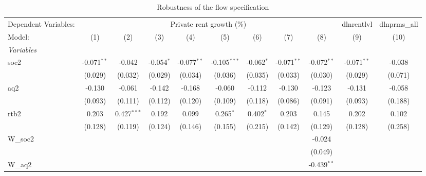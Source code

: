 
\begin{table}[htbp]
   \caption{Robustness of the flow specification}
   \centering
   \begin{tabular}{lcccccccccc}
      \tabularnewline \midrule \midrule
      Dependent Variables: & \multicolumn{8}{c}{Private rent growth (\%)} & dlnrentlvl & dlnprms\_all\\
      Model:        & (1)           & (2)           & (3)          & (4)           & (5)            & (6)          & (7)           & (8)           & (9)           & (10)\\  
      \midrule
      \emph{Variables}\\
      soc2          & -0.071$^{**}$ & -0.042        & -0.054$^{*}$ & -0.077$^{**}$ & -0.105$^{***}$ & -0.062$^{*}$ & -0.071$^{**}$ & -0.072$^{**}$ & -0.071$^{**}$ & -0.038\\   
                    & (0.029)       & (0.032)       & (0.029)      & (0.034)       & (0.036)        & (0.035)      & (0.033)       & (0.030)       & (0.029)       & (0.071)\\   
      aq2           & -0.130        & -0.061        & -0.142       & -0.168        & -0.060         & -0.112       & -0.130        & -0.123        & -0.131        & -0.058\\   
                    & (0.093)       & (0.111)       & (0.112)      & (0.120)       & (0.109)        & (0.118)      & (0.086)       & (0.091)       & (0.093)       & (0.188)\\   
      rtb2          & 0.203         & 0.427$^{***}$ & 0.192        & 0.099         & 0.265$^{*}$    & 0.402$^{*}$  & 0.203         & 0.145         & 0.202         & 0.102\\   
                    & (0.128)       & (0.119)       & (0.124)      & (0.146)       & (0.155)        & (0.215)      & (0.142)       & (0.129)       & (0.128)       & (0.258)\\   
      W\_soc2       &               &               &              &               &                &              &               & -0.024        &               &   \\   
                    &               &               &              &               &                &              &               & (0.049)       &               &   \\   
      W\_aq2        &               &               &              &               &                &              &               & -0.439$^{**}$ &               &   \\   

\end{tabular}
\end{table}
